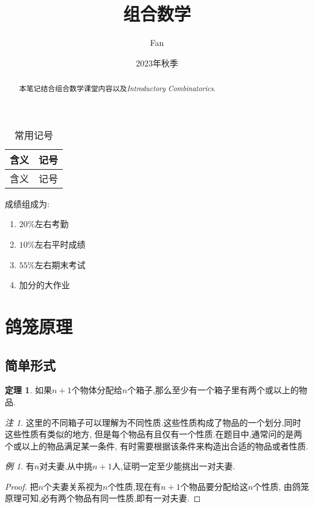 \documentclass[a4paper,11pt]{article}%
\author{Fan}
\title{组合数学}
\date{2023年秋季}
\theoremstyle{remark}
\newtheorem*{remark}{注}
\theoremstyle{remark}
\newtheorem*{example}{例}
\theoremstyle{definition}
\newtheorem{theorem}{定理}[section]
\theoremstyle{definition}
\theoremstyle{definition}
\begin{document}
\maketitle
\tableofcontents
\begin{abstract}
    本笔记结合组合数学课堂内容以及\emph{Introductory Combinatorics}.
\end{abstract}
\pagestyle{plain}%
\begin{longtable}{cc}
       \caption{常用记号} \\
       \multicolumn{1}{c}{含义}&\multicolumn{1}{c}{记号}\\
       \hline
       \endfirsthead
       \multicolumn{1}{c}{含义}&\multicolumn{1}{c}{记号}\\
       \hline\endhead
 \end{longtable}
\newpage
成绩组成为:
\begin{enumerate}
    \item$20\%$左右考勤
    \item$10\%$左右平时成绩 
    \item$55\%$左右期末考试
    \item 加分的大作业
\end{enumerate}
\newpage
\section{鸽笼原理}
\subsection{简单形式}
\begin{theorem}
    如果$n+1$个物体分配给$n$个箱子,那么至少有一个箱子里有两个或以上的物品.
\end{theorem}
\begin{remark}
    这里的不同箱子可以理解为不同性质.这些性质构成了物品的一个划分,同时这些性质有类似的地方,
    但是每个物品有且仅有一个性质.在题目中,通常问的是两个或以上的物品满足某一条件,
    有时需要根据该条件来构造出合适的物品或者性质.
\end{remark}
\begin{example}
    有$n$对夫妻,从中挑$n+1$人,证明一定至少能挑出一对夫妻.
    \begin{proof}
        把$n$个夫妻关系视为$n$个性质,现在有$n+1$个物品要分配给这$n$个性质,
        由鸽笼原理可知,必有两个物品有同一性质,即有一对夫妻.
    \end{proof}
\end{example}
\end{document}
